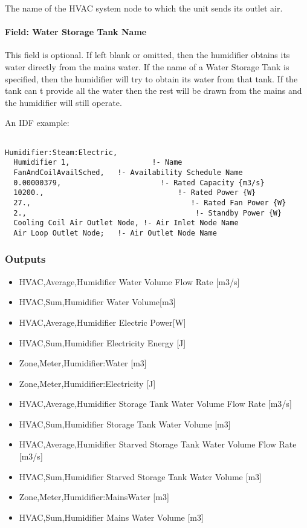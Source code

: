 The name of the HVAC system node to which the unit sends its outlet air.

\paragraph{Field: Water Storage Tank Name}\label{field-water-storage-tank-name}

This field is optional. If left blank or omitted, then the humidifier obtains its water directly from the mains water. If the name of a Water Storage Tank is specified, then the humidifier will try to obtain its water from that tank. If the tank can t provide all the water then the rest will be drawn from the mains and the humidifier will still operate.

An IDF example:

\begin{lstlisting}

Humidifier:Steam:Electric,
  Humidifier 1,                   !- Name
  FanAndCoilAvailSched,   !- Availability Schedule Name
  0.00000379,                       !- Rated Capacity {m3/s}
  10200.,                               !- Rated Power {W}
  27.,                                     !- Rated Fan Power {W}
  2.,                                       !- Standby Power {W}
  Cooling Coil Air Outlet Node, !- Air Inlet Node Name
  Air Loop Outlet Node;   !- Air Outlet Node Name
\end{lstlisting}

\subsubsection{Outputs}\label{outputs-016}

\begin{itemize}
\item
  HVAC,Average,Humidifier Water Volume Flow Rate {[}m3/s{]}
\item
  HVAC,Sum,Humidifier Water Volume{[}m3{]}
\item
  HVAC,Average,Humidifier Electric Power{[}W{]}
\item
  HVAC,Sum,Humidifier Electricity Energy {[}J{]}
\item
  Zone,Meter,Humidifier:Water {[}m3{]}
\item
  Zone,Meter,Humidifier:Electricity {[}J{]}
\item
  HVAC,Average,Humidifier Storage Tank Water Volume Flow Rate {[}m3/s{]}
\item
  HVAC,Sum,Humidifier Storage Tank Water Volume {[}m3{]}
\item
  HVAC,Average,Humidifier Starved Storage Tank Water Volume Flow Rate {[}m3/s{]}
\item
  HVAC,Sum,Humidifier Starved Storage Tank Water Volume {[}m3{]}
\item
  Zone,Meter,Humidifier:MainsWater {[}m3{]}
\item
  HVAC,Sum,Humidifier Mains Water Volume {[}m3{]}
\end{itemize}


